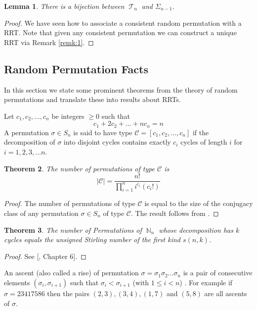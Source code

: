 \documentclass[oneside]{book} %
\newtheorem{thm}{Theorem}[section]
\newtheorem{lem}[thm]{Lemma}
\theoremstyle{definition}
\numberwithin{equation}{section}
\DeclareMathOperator{\T}{\mathcal{T}}
\DeclareMathOperator{\N}{\mathbb{N}}
\begin{document}
 
\begin{lem}
  There is a bijection between $\T_n$ and $\Sigma_{n-1}$.
\end{lem}
\begin{proof}
 We have seen how to associate a consistent random permutation with a RRT.  Note that given any consistent permutation we can construct  a unique RRT via Remark \ref{remk:1}.    
\end{proof}

\subsection{Random Permutation Facts}
In this section we state some prominent theorems from the theory of random permutations and translate these into results 
about RRTs.  

Let $c_1,c_2,\dots,c_n$ be integers $\geq 0$ such that 
\[c_1 + 2c_2 + \dots + nc_n = n\]
A permutation $\sigma \in S_n$ is said to have type $\mathcal{C} = [c_1,c_2,\dots , c_n]$ if the decomposition of $\sigma$ into disjoint cycles contains exactly $c_i$ cycles of length $i$ for $i = 1,2,3,\dots n$.  

\begin{thm}\label{thm:perms}
 The number of permutations of type $\mathcal{C}$ is 
 \[
  \lvert \mathcal{C} \rvert = \frac{n!}{\prod_{i=1}^{n}i^{c_{i}}(c_i!)}
 \]

\end{thm}
\begin{proof}
 The number of permutations of type $\mathcal{C}$ is equal to the size of the conjugacy class of any permutation $\sigma \in S_n$ of type $\mathcal{C}$.  The result follows from  \cite{Sagan}.
\end{proof}

\begin{thm}\label{thm:stirling}
 The number of Permutations of $\N_n$ whose decomposition has $k$ cycles equals the unsigned Stirling number of the first kind $s(n,k)$.
\end{thm}
\begin{proof}
 See [\cite{Comtet}, Chapter 6]. 
\end{proof}

An ascent (also called a rise) of permutation $\sigma = \sigma_1\sigma_2 \dots\sigma_n$ is a pair of consecutive elements 
$(\sigma_i,\sigma_{i+1})$ such that $\sigma_i < \sigma_{i+1}$  (with $1 \leq i < n$) \cite{Flajolet}.  For example if 
$\sigma = 23417586$ then the pairs $(2,3), (3,4),(1,7)$ and $(5,8)$ are all ascents of $\sigma$.  
\end{document}
